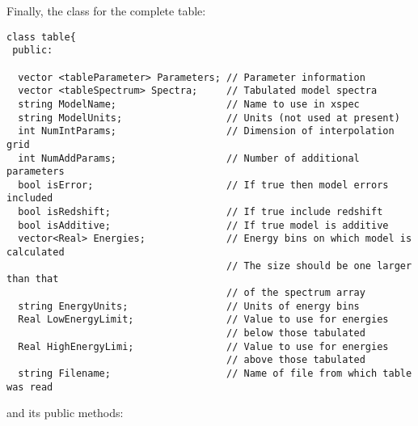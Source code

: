 \documentclass[11pt]{book}
\begin{document}
Finally, the class for the complete table:

\begin{verbatim}
class table{
 public:

  vector <tableParameter> Parameters; // Parameter information
  vector <tableSpectrum> Spectra;     // Tabulated model spectra
  string ModelName;                   // Name to use in xspec
  string ModelUnits;                  // Units (not used at present)
  int NumIntParams;                   // Dimension of interpolation grid
  int NumAddParams;                   // Number of additional parameters
  bool isError;                       // If true then model errors included
  bool isRedshift;                    // If true include redshift
  bool isAdditive;                    // If true model is additive
  vector<Real> Energies;              // Energy bins on which model is calculated
                                      // The size should be one larger than that
                                      // of the spectrum array
  string EnergyUnits;                 // Units of energy bins
  Real LowEnergyLimit;                // Value to use for energies
                                      // below those tabulated
  Real HighEnergyLimi;                // Value to use for energies
                                      // above those tabulated
  string Filename;                    // Name of file from which table was read
\end{verbatim}

and its public methods:
\end{document}
